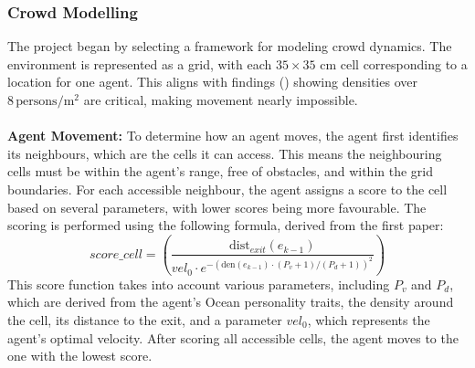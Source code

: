 \documentclass[12pt]{article}
\begin{document}
\begin{spacing}{1.15}
\begin{multicols}{2}
\subsubsection{Crowd Modelling}
The project began by selecting a framework for modeling crowd dynamics.  
The environment is represented as a grid, with each $35 \times 35$ cm cell corresponding to a location for one agent. This aligns with findings (\cite{youtube_crowd_density}) showing densities over $8 \, \text{persons}/\text{m}^2$ are critical, making movement nearly impossible.\\
\\
\textbf{Agent Movement:} To determine how an agent moves, the agent first identifies its neighbours, which are the cells it can access. This means the neighbouring cells must be within the agent's range, free of obstacles, and within the grid boundaries.
For each accessible neighbour, the agent assigns a score to the cell based on several parameters, with lower scores being more favourable. The scoring is performed using the following formula, derived from the first paper:
$$
score\_cell = \left( \frac{\text{dist}_{exit}(e_{k-1})}{vel_0 \cdot e^{-\left( \text{den}(e_{k-1}) \cdot (P_v + 1) / (P_d + 1) \right)^2}} \right)
$$
This score function takes into account various parameters, including $P_v$ and $P_d$, which are derived from the agent's Ocean personality traits, the density around the cell, its distance to the exit, and a parameter $vel_0$, which represents the agent's optimal velocity.
After scoring all accessible cells, the agent moves to the one with the lowest score.


\end{multicols}
\end{spacing}
\end{document}
